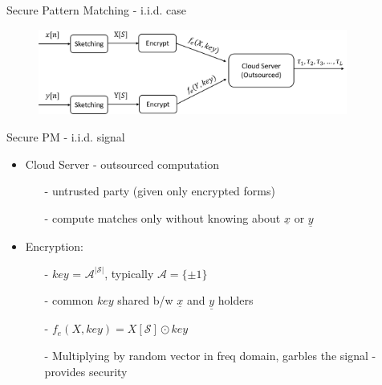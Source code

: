 \documentclass[10pt,xcolor=table]{beamer}
\newcommand{\xv}{\underline{x}}
\newcommand{\yv}{\underline{y}}
\begin{document}
\begin{frame}{Secure Pattern Matching - i.i.d. case}
\begin{figure}
	\centering
	\includegraphics[width=4.0in]{securePM_iid.png}
\end{figure}
\begin{block}{Secure PM - i.i.d. signal}
	\begin{itemize}
		\item Cloud Server - outsourced computation
		\begin{itemize}
			\item[-] untrusted party (given only encrypted forms)
			\item[-] compute matches only without knowing about $\xv$ or $\yv$
		\end{itemize}
		\item Encryption:
		\begin{itemize}
			\item[-] $key$ = $\mathcal{A}^{|\mathcal{S}|}$, typically $\mathcal{A} = \{\pm 1\}$
			\item[-] common $key$ shared b/w $\xv$ and $\yv$ holders  
			\item[-] $f_e(X,key) = X[\mathcal{S}] \odot key
			$
			\item[-] Multiplying by random vector in freq domain, garbles the signal - provides security 
		\end{itemize}
	\end{itemize}
\end{block}
\end{frame}
\end{document}
